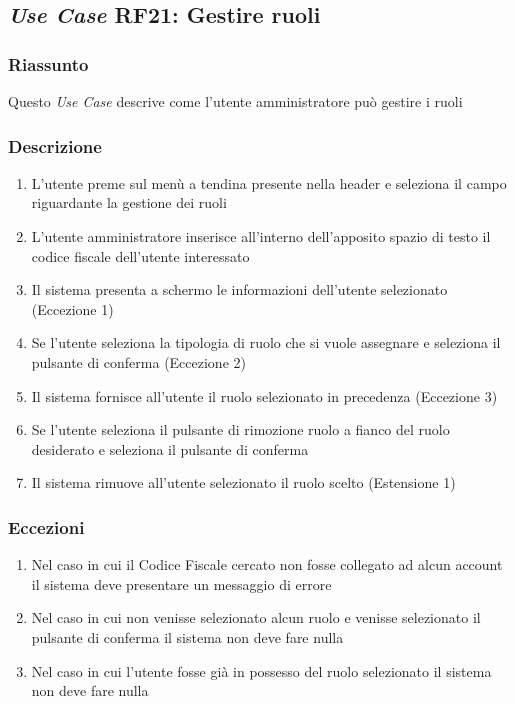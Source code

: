     \subsection{\textit{Use Case} RF21: Gestire ruoli}
        \subsubsection{Riassunto}
            Questo \textit{Use Case} descrive come l'utente amministratore può gestire i ruoli
        \subsubsection{Descrizione}
            \begin{enumerate}
                \item L'utente preme sul menù a tendina presente nella header e seleziona il campo riguardante la gestione dei ruoli
                \item L'utente amministratore inserisce all'interno dell'apposito spazio di testo il codice fiscale dell'utente interessato
                \item Il sistema presenta a schermo le informazioni dell'utente selezionato (Eccezione 1)
                \item Se l'utente seleziona la tipologia di ruolo che si vuole assegnare e seleziona il pulsante di conferma (Eccezione 2)
                \item Il sistema fornisce all'utente il ruolo selezionato in precedenza (Eccezione 3)
                \item Se l'utente seleziona il pulsante di rimozione ruolo a fianco del ruolo desiderato e seleziona il pulsante di conferma
                \item Il sistema rimuove all'utente selezionato il ruolo scelto (Estensione 1)
            \end{enumerate}
        \subsubsection{Eccezioni}
            \begin{enumerate}
                \item Nel caso in cui il Codice Fiscale cercato non fosse collegato ad alcun account il sistema deve presentare un messaggio di errore
                \item Nel caso in cui non venisse selezionato alcun ruolo e venisse selezionato il pulsante di conferma il sistema non deve fare nulla
                \item Nel caso in cui l'utente fosse già in possesso del ruolo selezionato il sistema non deve fare nulla
            \end{enumerate}
